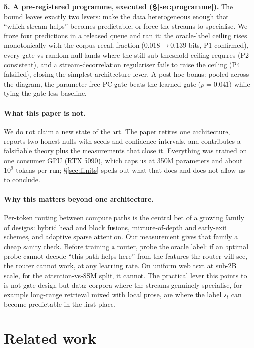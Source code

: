 \documentclass[11pt,a4paper]{article}
\begin{document}
\textbf{5. A pre-registered programme, executed (\S\ref{sec:programme}).}
The bound leaves exactly two levers: make the data heterogeneous enough
that ``which stream helps'' becomes predictable, or force the streams to
specialise. We froze four predictions in a released queue and ran it: the
oracle-label ceiling rises monotonically with the corpus recall fraction
($0.018 \to 0.139$ bits, P1 confirmed), every gate-vs-random null lands
where the still-sub-threshold ceiling requires (P2 consistent), and a
stream-decorrelation regulariser fails to raise the ceiling (P4
falsified), closing the simplest architecture lever. A post-hoc bonus:
pooled across the diagram, the parameter-free PC gate beats the learned
gate ($p = 0.041$) while tying the gate-less baseline.

\paragraph{What this paper is not.} We do not claim a new state of the
art. The paper retires one architecture, reports two honest nulls with
seeds and confidence intervals, and contributes a falsifiable theory plus
the measurements that close it. Everything was trained on one consumer
GPU (RTX 5090), which caps us at 350M parameters and about $10^9$ tokens
per run; \S\ref{sec:limits} spells out what that does and does not allow
us to conclude.

\paragraph{Why this matters beyond one architecture.} Per-token routing
between compute paths is the central bet of a growing family of designs:
hybrid head and block fusions, mixture-of-depth and early-exit schemes,
and adaptive sparse attention. Our measurement gives that family a cheap
sanity check. Before training a router, probe the oracle label: if an
optimal probe cannot decode ``this path helps here'' from the features the
router will see, the router cannot work, at any learning rate. On uniform
web text at sub-2B scale, for the attention-vs-SSM split, it cannot. The
practical lever this points to is not gate design but data: corpora where
the streams genuinely specialise, for example long-range retrieval mixed
with local prose, are where the label $s_t$ can become predictable in the
first place.

\section{Related work}
\label{sec:related}
\end{document}
